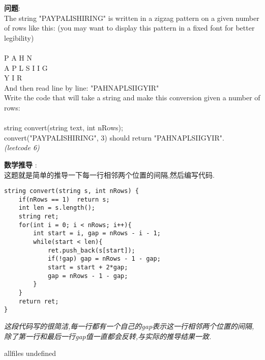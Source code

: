 \documentclass{article}
\begin{document}
\begin{CJK}{UTF8}{gbsn}     %

\else
    
\begin{description}
    \item{\textbf{问题}}:\\
	The string "PAYPALISHIRING" is written in a zigzag pattern on a given number of rows like this: (you may want to display this pattern in a fixed font for better legibility)\\ \\

	P   A   H   N\\
	A P L S I I G\\
	Y   I   R\\
	And then read line by line: "PAHNAPLSIIGYIR"\\
	Write the code that will take a string and make this conversion given a number of rows:\\ \\

	string convert(string text, int nRows);\\
	convert("PAYPALISHIRING", 3) should return "PAHNAPLSIIGYIR".\\
 \textit{(leetcode 6)}
    \item{\textbf{数学推导}} : 
    \\这题就是简单的推导一下每一行相邻两个位置的间隔,然后编写代码.
    \begin{lstlisting}
string convert(string s, int nRows) {
	if(nRows == 1)	return s;
	int len = s.length();
	string ret;
	for(int i = 0; i < nRows; i++){
		int start = i, gap = nRows - i - 1;
		while(start < len){
			ret.push_back(s[start]);
			if(!gap) gap = nRows - 1 - gap;
			start = start + 2*gap;
			gap = nRows - 1 - gap;
		}
	}
	return ret;
}
    \end{lstlisting}
    \textit{这段代码写的很简洁,每一行都有一个自己的gap表示这一行相邻两个位置的间隔,除了第一行和最后一行gap值一直都会反转,与实际的推导结果一致.}
\end{description}

\fi

\ifx allfiles undefined
\end{CJK}
\end{document}
